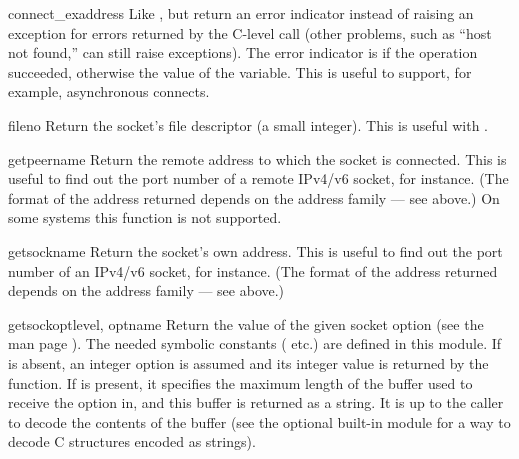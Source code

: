 \begin{methoddesc}[socket]{connect_ex}{address}
Like , but return an error indicator
instead of raising an exception for errors returned by the C-level
 call (other problems, such as ``host not found,''
can still raise exceptions).  The error indicator is  if the
operation succeeded, otherwise the value of the 
variable.  This is useful to support, for example, asynchronous connects.
\end{methoddesc}

\begin{methoddesc}[socket]{fileno}{}
Return the socket's file descriptor (a small integer).  This is useful
with .
\end{methoddesc}

\begin{methoddesc}[socket]{getpeername}{}
Return the remote address to which the socket is connected.  This is
useful to find out the port number of a remote IPv4/v6 socket, for instance.
(The format of the address returned depends on the address family ---
see above.)  On some systems this function is not supported.
\end{methoddesc}

\begin{methoddesc}[socket]{getsockname}{}
Return the socket's own address.  This is useful to find out the port
number of an IPv4/v6 socket, for instance.
(The format of the address returned depends on the address family ---
see above.)
\end{methoddesc}

\begin{methoddesc}[socket]{getsockopt}{level, optname}
Return the value of the given socket option (see the \UNIX{} man page
).  The needed symbolic constants
( etc.) are defined in this module.  If 
is absent, an integer option is assumed and its integer value
is returned by the function.  If  is present, it specifies
the maximum length of the buffer used to receive the option in, and
this buffer is returned as a string.  It is up to the caller to decode
the contents of the buffer (see the optional built-in module
 for a way to decode C structures encoded as strings).
\end{methoddesc}

